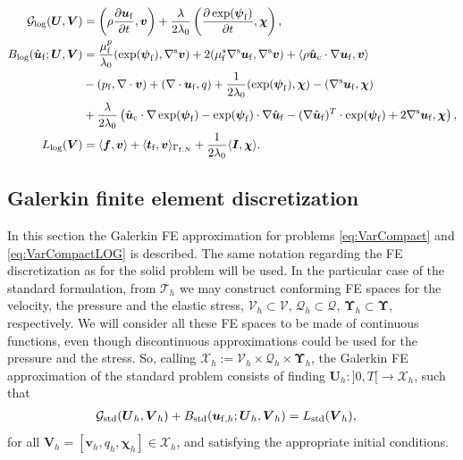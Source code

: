 \documentclass[11pt,english]{article}
\def\ufluid{\boldsymbol{u}_{\rm{f}}}
\def\ufluidh{\boldsymbol{u}_{{\rm{f}},h}}
\def\ufluidhat{\hat{\boldsymbol{u}}_{\rm{f}}}
\def\pfluid{p_{\rm{f}}}
\def\psifluid{\boldsymbol{\psi}_{\rm{f}}}
\def\viscs{\mu^{s}_{\rm{f}}}
\def\viscp{\mu^{p}_{\rm{f}}}
\def\alevelocityhat{\hat{\boldsymbol{u}}_{\mathrm{c}}}
\begin{document}
\begin{align}
    \mathcal{G}_{\log}(\boldsymbol{U},\boldsymbol{V}) & =\left(\rho\dfrac{\partial\ufluid}{\partial t},\boldsymbol{v}\right)+\dfrac{\lambda}{2\lambda_{0}}\left(\frac{\partial\exp(\psifluid)}{\partial t},\boldsymbol{\chi}\right), \\
    B_{\log}(\ufluidhat;\boldsymbol{U},\boldsymbol{V}) & =\dfrac{\viscp}{\lambda_{0}}(\exp(\psifluid),\nabla^{\rm s}\boldsymbol{v})+2(\viscs\nabla^{\rm s}\ufluid,\nabla^{\rm s}\boldsymbol{v})+\langle\rho\alevelocityhat\cdot\nabla\ufluid,\boldsymbol{v}\rangle\nonumber \\
     & -(\pfluid,\nabla\cdot\boldsymbol{v})+(\nabla\cdot\ufluid,q)+\dfrac{1}{2\lambda_{0}}(\exp(\psifluid),\boldsymbol{\chi})-(\nabla^{\rm s}\ufluid,\boldsymbol{\chi})\nonumber \\
     & +\dfrac{\lambda}{2\lambda_{0}}\left(\alevelocityhat\cdot\nabla\exp(\psifluid)-\exp(\psifluid)\cdot\nabla\ufluidhat-(\nabla\ufluidhat)^{T}\cdot\exp(\psifluid)+2\nabla^{\rm s}\ufluid,\boldsymbol{\chi}\right),\label{eq:OperatorB}\\
    L_{\log}(\boldsymbol{V}) & =\langle\boldsymbol{f},\boldsymbol{v}\rangle+ \langle\boldsymbol{t}_{\rm f},\boldsymbol{v}\rangle_{\Gamma_{{\rm f} , N}}
    +\dfrac{1}{2\lambda_{0}}\langle\boldsymbol{I},\boldsymbol{\chi}\rangle.
\end{align}

\subsection{Galerkin finite element discretization}

In this section the Galerkin FE approximation for problems \eqref{eq:VarCompact} and \eqref{eq:VarCompactLOG} is described. The same notation regarding the FE discretization as for the solid problem will be used. In the particular case of the standard formulation, from $\mathcal{T}_{h}$ we may construct conforming FE spaces for the velocity, the pressure and the elastic stress, $\boldsymbol{\mathcal{V}}_{h}\subset\boldsymbol{\mathcal{V}}$, $\mathcal{Q}_{h}\subset\mathcal{Q}$, $\boldsymbol{\Upsilon}_{h}\subset\boldsymbol{\Upsilon}$, respectively. We will consider all these FE spaces to be made of continuous functions, even though discontinuous approximations could be used for the pressure and the stress. So, calling $\boldsymbol{\mathcal{X}}_{h}:=\boldsymbol{\mathcal{V}}_{h}\times\mathcal{Q}_{h}\times\boldsymbol{\Upsilon}_{h}$,
the Galerkin FE approximation of the standard problem consists of finding $\boldsymbol{U}_{h}:]0,T[\longrightarrow\boldsymbol{\mathcal{X}}_{h}$, such that
\begin{align*}
    \mathcal{G}_{\text{std}}(\boldsymbol{U}_{h},\boldsymbol{V}_{h})+B_{\text{std}}(\ufluidh;\boldsymbol{U}_{h},\boldsymbol{V}_{h}) & =L_{\text{std}}(\boldsymbol{V}_{h}),
\end{align*}
for all $\boldsymbol{V}_{h}=[\boldsymbol{v}_{h},q_{h},\boldsymbol{\boldsymbol{\chi}}_{h}]\in\boldsymbol{\mathcal{X}}_{h}$,
and satisfying the appropriate initial conditions.
\end{document}
